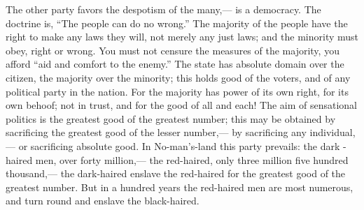 \documentclass[12pt]{article}
\begin{document}
The other party favors the despotism of the many,--- is a democracy. The doctrine is, ``The people can do no wrong.'' The majority of the people have the right to make any laws they will, not merely any just laws; and the minority must obey, right or wrong. You must not censure the measures of the majority, you afford ``aid and comfort to the enemy.'' The state has absolute domain over the citizen, the majority over the minority; this holds good of the voters, and of any political party in the nation. For the majority has power of its own right, for its own behoof; not in trust, and for the good of all and each! The aim of sensational politics is the greatest good of the greatest number; this may be obtained by sacrificing the greatest good of the lesser number,--- by sacrificing any individual,--- or sacrificing absolute good. In No-man's-land this party prevails: the dark -haired men, over forty million,--- the red-haired, only three million five hundred thousand,--- the dark-haired enslave the red-haired for the greatest good of the greatest number. But in a hundred years the red-haired men are most numerous, and turn round and enslave the black-haired. 
\end{document}
